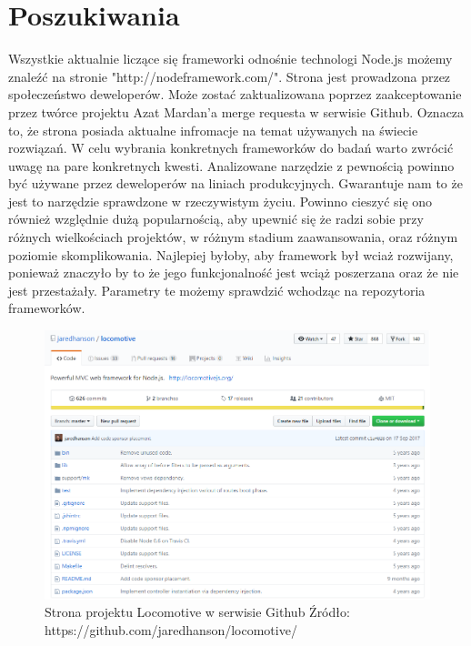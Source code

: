 \documentclass[12pt]{report}
\begin{document}
  \section{Poszukiwania}
    Wszystkie aktualnie liczące się frameworki odnośnie technologi Node.js możemy znaleźć na stronie "http://nodeframework.com/".
    Strona jest prowadzona przez społeczeństwo deweloperów.
    Może zostać zaktualizowana poprzez zaakceptowanie przez twórce projektu Azat Mardan'a merge requesta w serwisie Github.
    Oznacza to, że strona posiada aktualne infromacje na temat używanych na świecie rozwiązań.
    W celu wybrania konkretnych frameworków do badań warto zwrócić uwagę na pare konkretnych kwesti.
    \newline
    Analizowane narzędzie z pewnością powinno być używane przez deweloperów na liniach produkcyjnych.
    Gwarantuje nam to że jest to narzędzie sprawdzone w rzeczywistym życiu.
    Powinno cieszyć się ono również względnie dużą popularnością, aby upewnić się że radzi sobie przy różnych wielkościach projektów, w różnym stadium zaawansowania, oraz różnym poziomie skomplikowania.
    Najlepiej byłoby, aby framework był wciaż rozwijany, ponieważ znaczyło by to że jego funkcjonalność jest wciąż poszerzana oraz że nie jest przestażały.
    Parametry te możemy sprawdzić wchodząc na repozytoria frameworków.
    \pagebreak
    \begin{figure}[H]
      \centering
      \includegraphics[width=\textwidth,height=\textheight,keepaspectratio]{locomotive.png} 
      \caption{Strona projektu Locomotive w serwisie Github \newline Źródło: https://github.com/jaredhanson/locomotive/}
    \end{figure}
\end{document}

